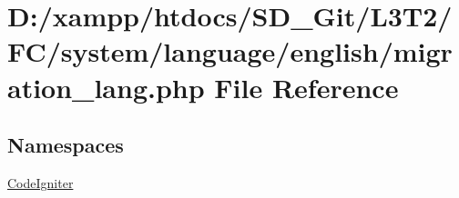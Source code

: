 \hypertarget{system_2language_2english_2migration__lang_8php}{}\section{D\+:/xampp/htdocs/\+S\+D\+\_\+\+Git/\+L3\+T2/\+F\+C/system/language/english/migration\+\_\+lang.php File Reference}
\label{system_2language_2english_2migration__lang_8php}
\subsection*{Namespaces}
\begin{DoxyCompactItemize}
\item 
 \hyperlink{namespace_code_igniter}{Code\+Igniter}
\end{DoxyCompactItemize}
